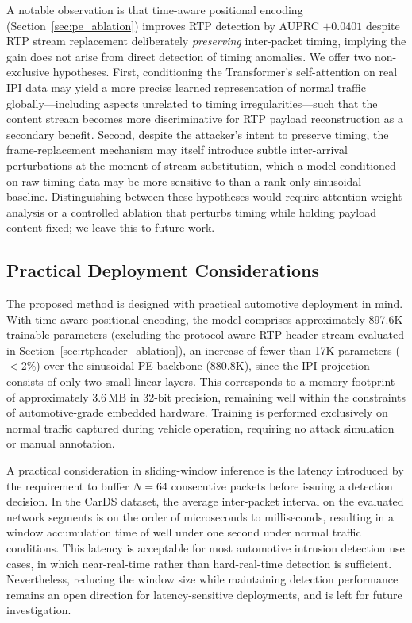 A notable observation is that time-aware positional encoding (Section~\ref{sec:pe_ablation}) improves RTP detection by AUPRC $+0.0401$ despite RTP stream replacement deliberately \emph{preserving} inter-packet timing, implying the gain does not arise from direct detection of timing anomalies. We offer two non-exclusive hypotheses. First, conditioning the Transformer's self-attention on real IPI data may yield a more precise learned representation of normal traffic globally---including aspects unrelated to timing irregularities---such that the content stream becomes more discriminative for RTP payload reconstruction as a secondary benefit. Second, despite the attacker's intent to preserve timing, the frame-replacement mechanism may itself introduce subtle inter-arrival perturbations at the moment of stream substitution, which a model conditioned on raw timing data may be more sensitive to than a rank-only sinusoidal baseline. Distinguishing between these hypotheses would require attention-weight analysis or a controlled ablation that perturbs timing while holding payload content fixed; we leave this to future work.

\subsection{Practical Deployment Considerations}
The proposed method is designed with practical automotive deployment in mind. With time-aware positional encoding, the model comprises approximately 897.6K trainable parameters (excluding the protocol-aware RTP header stream evaluated in Section~\ref{sec:rtpheader_ablation}), an increase of fewer than 17K parameters ($<$2\%) over the sinusoidal-PE backbone (880.8K), since the IPI projection consists of only two small linear layers. This corresponds to a memory footprint of approximately 3.6\,MB in 32-bit precision, remaining well within the constraints of automotive-grade embedded hardware. Training is performed exclusively on normal traffic captured during vehicle operation, requiring no attack simulation or manual annotation.

A practical consideration in sliding-window inference is the latency introduced by the requirement to buffer $N = 64$ consecutive packets before issuing a detection decision. In the CarDS dataset, the average inter-packet interval on the evaluated network segments is on the order of microseconds to milliseconds, resulting in a window accumulation time of well under one second under normal traffic conditions. This latency is acceptable for most automotive intrusion detection use cases, in which near-real-time rather than hard-real-time detection is sufficient. Nevertheless, reducing the window size while maintaining detection performance remains an open direction for latency-sensitive deployments, and is left for future investigation.

